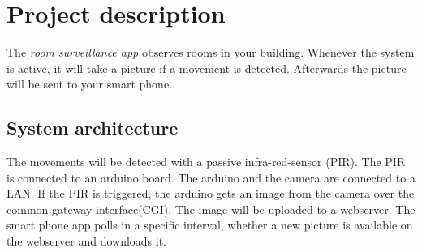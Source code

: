 \section{Project description}
The \emph{room surveillance app} observes rooms in your building. Whenever the system is active, it will take a picture if a movement is detected. Afterwards the picture will be sent to your smart phone.


\subsection{System architecture}
The movements will be detected with a passive infra-red-sensor (PIR). The PIR is connected to an arduino board. The arduino and the camera are connected to a LAN. If the PIR is triggered, the arduino gets an image from the camera over the common gateway interface(CGI). The image will be uploaded to a webserver. The smart phone app polls in a specific interval, whether a new picture is available on the webserver and downloads it.




